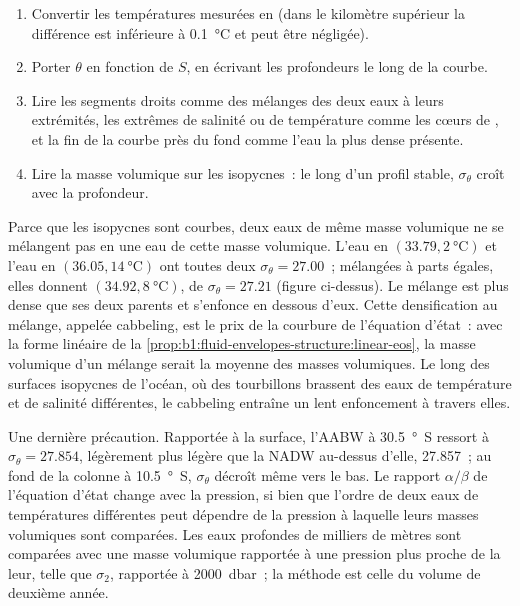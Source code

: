 \begin{method}\label{met:b1:fluid-envelopes-structure:ts}
\begin{enumerate}
  \item Convertir les températures mesurées en  (dans le kilomètre
        supérieur la différence est inférieure à \qty{0.1}{\celsius} et peut être
        négligée).
  \item Porter $\theta$ en fonction de $S$, en écrivant les profondeurs le long de la courbe.
  \item Lire les segments droits comme des mélanges des deux eaux à leurs extrémités,
        les extrêmes de salinité ou de température comme les cœurs de ,
        et la fin de la courbe près du fond comme l'eau la plus dense présente.
  \item Lire la masse volumique sur les isopycnes~: le long d'un profil stable,
        $\sigma_\theta$ croît avec la profondeur.
\end{enumerate}
\end{method}

Parce que les isopycnes sont courbes, deux eaux de même masse volumique ne se mélangent pas en
une eau de cette masse volumique. L'eau en $(33.79, \qty{2}{\celsius})$ et l'eau en
$(36.05, \qty{14}{\celsius})$ ont toutes deux $\sigma_\theta = 27.00$~; mélangées à
parts égales, elles donnent $(34.92, \qty{8}{\celsius})$, de $\sigma_\theta = 27.21$
(figure ci-dessus). Le mélange est plus dense que ses deux parents et s'enfonce en dessous d'eux.
Cette densification au mélange, appelée cabbeling, est le prix de la courbure de
l'équation d'état~: avec la forme linéaire de la
\cref{prop:b1:fluid-envelopes-structure:linear-eos}, la masse volumique d'un mélange
serait la moyenne des masses volumiques. Le long des surfaces isopycnes de l'océan,
où des tourbillons brassent des eaux de température et de salinité différentes, le cabbeling entraîne
un lent enfoncement à travers elles.

Une dernière précaution. Rapportée à la surface, l'AABW à \qty{30.5}{\degree S} ressort
à $\sigma_\theta = 27.854$, légèrement plus légère que la NADW au-dessus d'elle,
\num{27.857}~; au fond de la colonne à \qty{10.5}{\degree S}, $\sigma_\theta$
décroît même vers le bas. Le rapport $\alpha/\beta$ de l'équation d'état
change avec la pression, si bien que l'ordre de deux eaux de températures différentes
peut dépendre de la pression à laquelle leurs masses volumiques sont comparées. Les eaux
profondes de milliers de mètres sont comparées avec une masse volumique rapportée à une pression
plus proche de la leur, telle que $\sigma_2$, rapportée à \qty{2000}{dbar}~; la méthode
est celle du volume de deuxième année.

